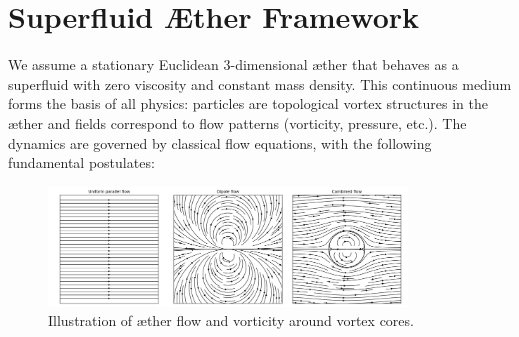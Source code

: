 
\section{Superfluid Æther Framework}

We assume a stationary Euclidean 3-dimensional æther that behaves as a superfluid with zero viscosity and constant mass density. This continuous medium forms the basis of all physics: particles are topological vortex structures in the æther and fields correspond to flow patterns (vorticity, pressure, etc.). The dynamics are governed by classical flow equations, with the following fundamental postulates:

\begin{figure}[htbp]
    \centering
    \includegraphics[width=0.85\textwidth]{03-combined_flow}
    \caption{Illustration of æther flow and vorticity around vortex cores.}
    \label{fig:vortexfields}
\end{figure}
